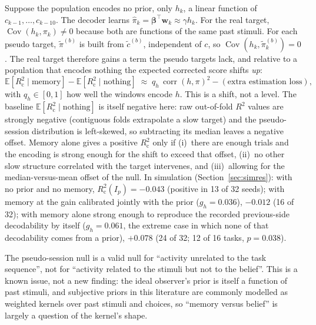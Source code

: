 \documentclass[11pt]{article}
\newcommand{\E}{\mathbb{E}}
\newcommand{\Cov}{\operatorname{Cov}}
\newcommand{\corr}{\operatorname{corr}}
\newcommand{\Rc}{R^2_{\mathrm{c}}}
\begin{document}
Suppose the population encodes no prior, only $h_k$, a linear function of $c_{k-1}, \dots, c_{k-10}$. The decoder
learns $\hat\pi_k = \bm\beta^\top \bm w_k \approx \gamma h_k$. For the real target, $\Cov(h_k, \pi_k) \neq 0$ because both
are functions of the same past stimuli. For each pseudo target, $\tilde\pi^{(b)}$ is built from $\tilde c^{(b)}$,
independent of $c$, so $\Cov(h_k, \tilde\pi^{(b)}_k) = 0$. The real target therefore gains a term the pseudo targets
lack, and relative to a population that encodes nothing the expected corrected score shifts \emph{up}:
\begin{equation}
\E[\Rc \mid \text{memory}] - \E[\Rc \mid \text{nothing}] \;\approx\; q_h\, \corr(h, \pi)^2 - (\text{extra estimation loss}),
\end{equation}
with $q_h \in [0, 1]$ how well the windows encode $h$. This is a shift, not a level. The baseline
$\E[\Rc \mid \text{nothing}]$ is itself negative here: raw out-of-fold $R^2$ values are strongly negative (contiguous
folds extrapolate a slow target) and the pseudo-session distribution is left-skewed, so subtracting its median leaves
a negative offset. Memory alone gives a positive $\Rc$ only if (i)~there are enough trials and the encoding is strong
enough for the shift to exceed that offset, (ii)~no other slow structure correlated with the target intervenes, and
(iii)~allowing for the median-versus-mean offset of the null. In simulation (Section~\ref{sec:simres}): with no prior
and no memory, $\Rc(I_p) = -0.043$ (positive in 13 of 32 seeds); with memory at the gain calibrated jointly with the
prior ($g_h = 0.036$), $-0.012$ (16 of 32); with memory alone strong enough to reproduce the recorded previous-side
decodability by itself ($g_h = 0.061$, the extreme case in which none of that decodability comes from a prior),
$+0.078$ (24 of 32; 12 of 16 tasks, $p = 0.038$).

The pseudo-session null is a valid null for ``activity unrelated to the task sequence'', not for ``activity
related to the stimuli but not to the belief''. This is a known issue, not a new finding: the ideal observer's prior is
itself a function of past stimuli, and subjective priors in this literature are commonly modelled as weighted kernels
over past stimuli and choices, so ``memory versus belief'' is largely a question of the kernel's shape.
\end{document}

